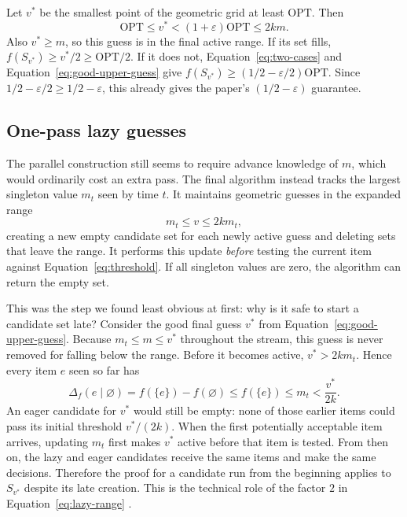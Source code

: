 \documentclass[10pt]{article}
\newcommand{\OPT}{\mathrm{OPT}}
\newcommand{\marg}[2]{\Delta_f(#1\mid #2)}
\begin{document}
Let $v^*$ be the smallest point of the geometric grid at least $\OPT$. Then
\begin{equation}
  \OPT\leq v^*<(1+\varepsilon)\OPT\leq2km.
  \label{eq:good-upper-guess}
\end{equation}
Also $v^*\geq m$, so this guess is in the final active range. If its set fills, $f(S_{v^*})\geq v^*/2\geq\OPT/2$. If it does not, Equation~\eqref{eq:two-cases} and Equation~\eqref{eq:good-upper-guess} give $f(S_{v^*})\geq(1/2-\varepsilon/2)\OPT$. Since $1/2-\varepsilon/2\geq1/2-\varepsilon$, this already gives the paper's $(1/2-\varepsilon)$ guarantee.

\subsection{One-pass lazy guesses}
The parallel construction still seems to require advance knowledge of $m$, which would ordinarily cost an extra pass. The final algorithm instead tracks the largest singleton value $m_t$ seen by time $t$. It maintains geometric guesses in the expanded range
\begin{equation}
  m_t\leq v\leq 2km_t,
  \label{eq:lazy-range}
\end{equation}
creating a new empty candidate set for each newly active guess and deleting sets that leave the range. It performs this update \emph{before} testing the current item against Equation~\eqref{eq:threshold}. If all singleton values are zero, the algorithm can return the empty set.

This was the step we found least obvious at first: why is it safe to start a candidate set late? Consider the good final guess $v^*$ from Equation~\eqref{eq:good-upper-guess}. Because $m_t\leq m\leq v^*$ throughout the stream, this guess is never removed for falling below the range. Before it becomes active, $v^*>2km_t$. Hence every item $e$ seen so far has
\begin{equation}
  \marg{e}{\varnothing}
  =f(\{e\})-f(\varnothing)
  \leq f(\{e\})
  \leq m_t
  <\frac{v^*}{2k}.
  \label{eq:missed-prefix}
\end{equation}
An eager candidate for $v^*$ would still be empty: none of those earlier items could pass its initial threshold $v^*/(2k)$. When the first potentially acceptable item arrives, updating $m_t$ first makes $v^*$ active before that item is tested. From then on, the lazy and eager candidates receive the same items and make the same decisions. Therefore the proof for a candidate run from the beginning applies to $S_{v^*}$ despite its late creation. This is the technical role of the factor $2$ in Equation~\eqref{eq:lazy-range} \cite{badanidiyuru2014streaming}.
\end{document}

